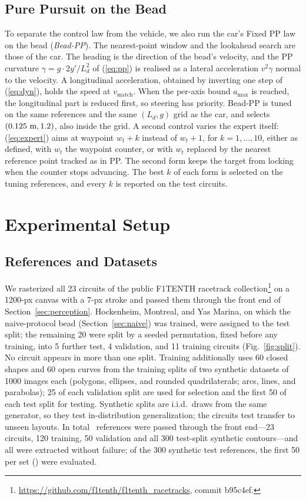 \documentclass[conference]{IEEEtran}
\begin{document}
\subsection{Pure Pursuit on the Bead}\label{sec:beadpp}
To separate the control law from the vehicle, we also run the car's Fixed PP law on the bead (\emph{Bead-PP}). The nearest-point window and the lookahead search are those of the car. The heading is the direction of the bead's velocity, and the PP curvature $\gamma=g\cdot2y'/L_d^2$ of (\ref{eq:pp}) is realised as a lateral acceleration $v^2\gamma$ normal to the velocity. A longitudinal acceleration, obtained by inverting one step of (\ref{eq:dyn}), holds the speed at $v_{\mathrm{match}}$. When the per-axis bound $a_{\max}$ is reached, the longitudinal part is reduced first, so steering has priority. Bead-PP is tuned on the same references and the same $(L_d,g)$ grid as the car, and selects $(\VbppL\ \mathrm{m},\VbppG)$, also inside the grid. A second control varies the expert itself: (\ref{eq:expert}) aims at waypoint $w_t+k$ instead of $w_t+1$, for $k=1,\dots,10$, either as defined, with $w_t$ the waypoint counter, or with $w_t$ replaced by the nearest reference point tracked as in PP. The second form keeps the target from locking when the counter stops advancing. The best $k$ of each form is selected on the tuning references, and every $k$ is reported on the test circuits.

\section{Experimental Setup}
\subsection{References and Datasets}
We rasterized all 23 circuits of the public F1TENTH racetrack collection\footnote{\url{https://github.com/f1tenth/f1tenth_racetracks}, commit b95c4ef.} on a 1200-px canvas with a 7-px stroke and passed them through the front end of Section~\ref{sec:perception}. Hockenheim, Montreal, and Yas Marina, on which the naive-protocol bead (Section~\ref{sec:naive}) was trained, were assigned to the test split; the remaining 20 were split by a seeded permutation, fixed before any training, into 5 further test, 4 validation, and 11 training circuits (Fig.~\ref{fig:split}). No circuit appears in more than one split. Training additionally uses 60 closed shapes and 60 open curves from the training splits of two synthetic datasets of 1000 images each (polygons, ellipses, and rounded quadrilaterals; arcs, lines, and parabolas); 25 of each validation split are used for selection and the first 50 of each test split for testing. Synthetic splits are i.i.d.\ draws from the same generator, so they test in-distribution generalization; the circuits test transfer to unseen layouts. In total \VnRefs~references were passed through the front end---23 circuits, 120 training, 50 validation and all 300 test-split synthetic contours---and all were extracted without failure; of the 300 synthetic test references, the first 50 per set (\VnSynthEval) were evaluated.
\end{document}
